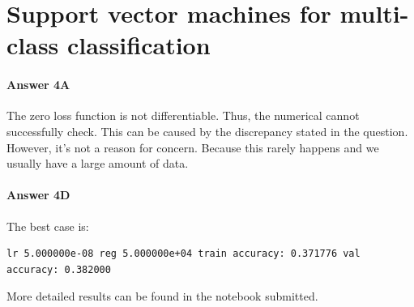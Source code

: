 \documentclass[paper=a4, fontsize=11pt]{scrartcl} %
\numberwithin{equation}{section} %
\numberwithin{figure}{section} %
\numberwithin{table}{section} %
\begin{document}
\section{Support vector machines for multi-class classification}
\paragraph{\textbf{Answer 4A}}
The zero loss function is not differentiable. Thus, the numerical cannot successfully check. This can be caused by the discrepancy stated in the question.
\\ However, it's not a reason for concern. Because this rarely happens and we usually have a large amount of data.
\paragraph{\textbf{Answer 4D}}
The best case is: 
\begin{verbatim}
lr 5.000000e-08 reg 5.000000e+04 train accuracy: 0.371776 val accuracy: 0.382000
\end{verbatim}
More detailed results can be found in the notebook submitted.
\end{document}
